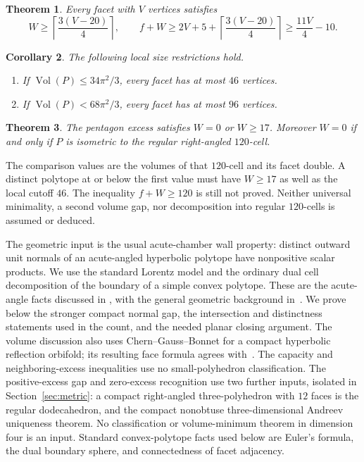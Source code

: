 \documentclass[11pt]{article}
\newtheorem{theorem}{Theorem}
\newtheorem{corollary}[theorem]{Corollary}
\theoremstyle{remark}
\newcommand{\Vol}{\operatorname{Vol}}
\begin{document}
\begin{theorem}\label{thm:neighbor-excess}
Every facet with $V$ vertices satisfies
\begin{equation}\label{eq:excess-bound}
 W\ge\left\lceil\frac{3(V-20)}4\right\rceil,\qquad
 f+W\ge2V+5+\left\lceil\frac{3(V-20)}4\right\rceil
       \ge\frac{11V}4-10.
\end{equation}
\end{theorem}

\begin{corollary}\label{cor:local-size}
The following local size restrictions hold.
\begin{enumerate}
\item If $\Vol(P)\le34\pi^2/3$, every facet has at most $46$ vertices.
\item If $\Vol(P)<68\pi^2/3$, every facet has at most $96$ vertices.
\end{enumerate}
\end{corollary}

\begin{theorem}\label{thm:gap}
The pentagon excess satisfies $W=0$ or $W\ge17$. Moreover $W=0$ if
and only if $P$ is isometric to the regular right-angled $120$-cell.
\end{theorem}

The comparison values are the volumes of that $120$-cell and its facet
double. A distinct polytope at or below the first value must have
$W\ge17$ as well as the local cutoff $46$. The inequality
$f+W\ge120$ is still not proved. Neither universal minimality, a second
volume gap, nor decomposition into regular $120$-cells is assumed or
deduced.

The geometric input is the usual acute-chamber wall property: distinct
outward unit normals of an acute-angled hyperbolic polytope have
nonpositive scalar products. We use the standard Lorentz model and the
ordinary dual cell decomposition of the boundary of a simple convex
polytope. These are the acute-angle facts discussed in
\cite[pp.~63--64 and Proposition~4.1]{PV}, with the general geometric
background in~\cite{AVS}. We prove below the stronger compact normal gap,
the intersection and distinctness statements used in the count, and the
needed planar closing argument. The volume discussion also uses
Chern--Gauss--Bonnet for a compact hyperbolic reflection orbifold; its
resulting face formula agrees with~\cite[Proposition~3.2(d)]{KP}.
The capacity and neighboring-excess inequalities use no small-polyhedron
classification. The positive-excess gap and zero-excess recognition use
two further inputs, isolated in Section~\ref{sec:metric}: a compact
right-angled three-polyhedron with $12$ faces is the regular dodecahedron,
and the compact nonobtuse three-dimensional Andreev uniqueness theorem.
No classification or volume-minimum theorem in dimension four is an
input. Standard convex-polytope facts used below are Euler's formula,
the dual boundary sphere, and connectedness of facet adjacency.
\end{document}
